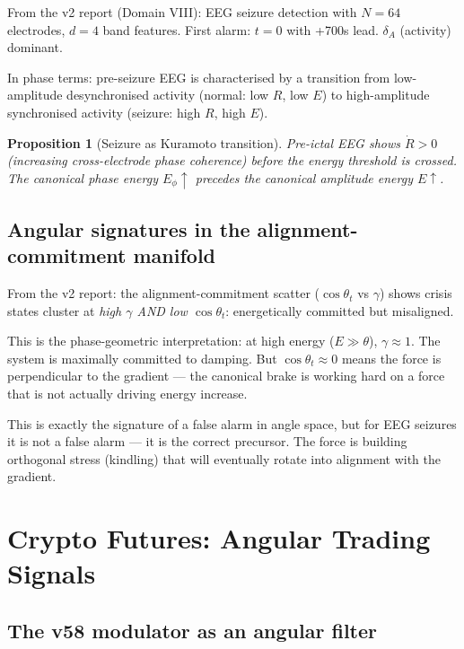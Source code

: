 \documentclass[11pt,a4paper,openany]{book}
\newtheorem{proposition}[theorem]{Proposition}
\theoremstyle{definition}
\begin{document}
From the v2 report (Domain VIII): EEG seizure detection with $N=64$ electrodes,
$d=4$ band features. First alarm: $t=0$ with +700s lead. $\delta_A$ (activity) dominant.

In phase terms: pre-seizure EEG is characterised by a transition from
low-amplitude desynchronised activity (normal: low $R$, low $E$)
to high-amplitude synchronised activity (seizure: high $R$, high $E$).

\begin{proposition}[Seizure as Kuramoto transition]
Pre-ictal EEG shows $\dot R > 0$ (increasing cross-electrode phase coherence)
before the energy threshold is crossed. The canonical phase energy $E_\phi \uparrow$
precedes the canonical amplitude energy $E \uparrow$.
\end{proposition}

\section{Angular signatures in the alignment-commitment manifold}

From the v2 report: the alignment-commitment scatter ($\cos\theta_t$ vs $\gamma$) shows
crisis states cluster at \emph{high $\gamma$ AND low $\cos\theta_t$}:
energetically committed but misaligned.

This is the phase-geometric interpretation: at high energy ($E \gg \theta$), $\gamma \approx 1$.
The system is maximally committed to damping. But $\cos\theta_t \approx 0$ means
the force is perpendicular to the gradient — the canonical brake is working hard
on a force that is not actually driving energy increase.

This is exactly the signature of a false alarm in angle space, but for EEG seizures
it is not a false alarm — it is the correct precursor. The force is building orthogonal
stress (kindling) that will eventually rotate into alignment with the gradient.

\chapter{Crypto Futures: Angular Trading Signals}

\section{The v58 modulator as an angular filter}
\end{document}
